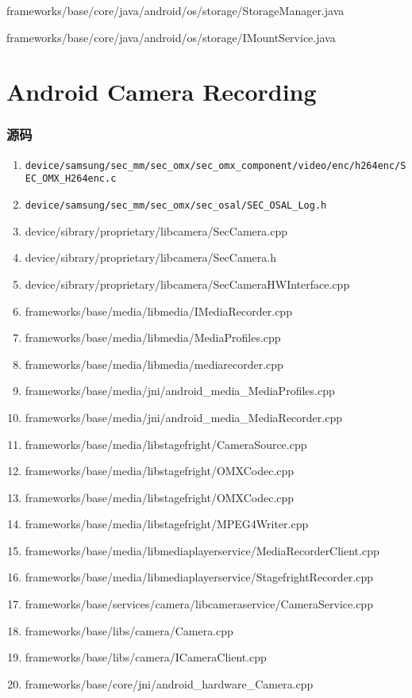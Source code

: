 \documentclass[a4paper,10pt,twoside]{article}%
\begin{document}
frameworks/base/core/java/android/os/storage/StorageManager.java

frameworks/base/core/java/android/os/storage/IMountService.java

\part{Android Camera Recording}
\section{源码}
\begin{enumerate} 
\setlength{\parskip}{-1pt}
\setlength{\itemsep}{3pt}
\setlength{\parsep}{0ex}
\renewcommand{\labelenumi}{(\theenumi)}
\item \verb|device/samsung/sec_mm/sec_omx/sec_omx_component/video/enc/h264enc/SEC_OMX_H264enc.c|
\item \verb|device/samsung/sec_mm/sec_omx/sec_osal/SEC_OSAL_Log.h|
\item device/sibrary/proprietary/libcamera/SecCamera.cpp
\item device/sibrary/proprietary/libcamera/SecCamera.h
\item \label{sechw}device/sibrary/proprietary/libcamera/SecCameraHWInterface.cpp  
\item frameworks/base/media/libmedia/IMediaRecorder.cpp  
\item frameworks/base/media/libmedia/MediaProfiles.cpp   
\item frameworks/base/media/libmedia/mediarecorder.cpp   
\item frameworks/base/media/jni/android\_media\_MediaProfiles.cpp 
\item frameworks/base/media/jni/android\_media\_MediaRecorder.cpp 
\item \label{camsrc}frameworks/base/media/libstagefright/CameraSource.cpp
\item frameworks/base/media/libstagefright/OMXCodec.cpp
\item frameworks/base/media/libstagefright/OMXCodec.cpp
\item frameworks/base/media/libstagefright/MPEG4Writer.cpp
\item frameworks/base/media/libmediaplayerservice/MediaRecorderClient.cpp  
\item frameworks/base/media/libmediaplayerservice/StagefrightRecorder.cpp  
\item frameworks/base/services/camera/libcameraservice/CameraService.cpp
\item frameworks/base/libs/camera/Camera.cpp             
\item frameworks/base/libs/camera/ICameraClient.cpp      
\item frameworks/base/core/jni/android\_hardware\_Camera.cpp      
\end{enumerate}
\end{document}

